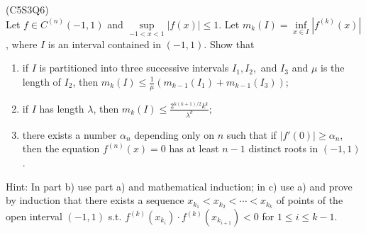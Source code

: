 \begin{prb}
    (C5S3Q6) \\
    Let $f \in C^{(n)}(- 1, 1)$ and $\sup\limits_{-1 < x < 1} |f(x)| \leq 1$. Let $m_k(I) = \inf\limits_{x \in I} |f^{(k)}(x)|$, where $I$ is an interval contained in 
    $(- 1, 1)$. Show that 
    \begin{enumerate}
        \item[a)] if $I$ is partitioned into three successive intervals $I_1, I_2,$ and $I_3$ and $\mu$ is the length of $I_2$, then $m_k(I) \leq \frac{1}{\mu} \left( 
            m_{k-1}(I_1) + m_{k-1}(I_3) \right);$
        \item[b)] if $I$ has length $\lambda$, then $m_k(I) \leq \frac{2^{k(k+1)/2} k^k}{\lambda^k};$
        \item[c)] there exists a number $\alpha_n$ depending only on $n$ such that if $|f'(0)| \geq \alpha_n$, then the equation $f^{(n)}(x) = 0$ has at least $n - 1$ 
            distinct roots in $(- 1, 1)$.
    \end{enumerate}
    Hint: In part b) use part a) and mathematical induction; in c) use a) and prove by induction that there exists a sequence $x_{k_1} < x_{k_2} < \cdots < x_{k_k}$ of 
    points of the open interval $(- 1, 1)$ s.t. $f^{(k)}(x_{k_i}) \cdot f^{(k)}(x_{k_{i+1}}) < 0$ for $1 \leq i \leq k - 1$.
\end{prb}
